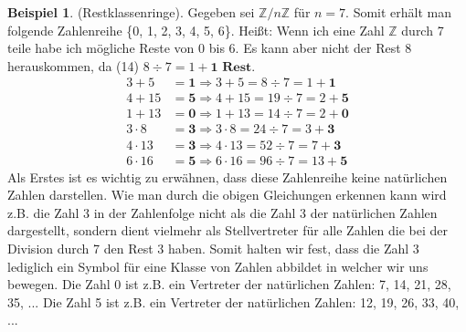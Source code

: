 \documentclass[12pt,a4paper]{article}
\theoremstyle{definition}
\newtheorem{bsp}{Beispiel}[subsection]
\begin{document}
\begin{bsp}(Restklassenringe).\newline
Gegeben sei $\mathbb{Z}/n \mathbb{Z}$ für $n = 7$.\newline
Somit erhält man folgende Zahlenreihe \{0, 1, 2, 3, 4, 5, 6\}.\newline
Heißt: Wenn ich eine Zahl $\mathbb{Z}$ durch 7 teile habe ich mögliche Reste von 0 bis 6.
Es kann aber nicht der Rest 8 herauskommen, da (14) $8 \div 7 = 1 + \textbf{1 Rest}$.
\begin{align}
3 + 5      &= \textbf{1} \Rightarrow 3 + 5 = 8  \div 7 = 1 + \textbf{1} \\
4 + 15     &= \textbf{5} \Rightarrow 4 + 15 = 19  \div 7 = 2 + \textbf{5} \\
1 + 13     &= \textbf{0} \Rightarrow 1 + 13 = 14  \div 7 = 2 + \textbf{0} \\
3 \cdot 8  &= \textbf{3} \Rightarrow 3 \cdot 8 = 24 \div 7 = 3 + \textbf{3}\\
4 \cdot 13 &= \textbf{3} \Rightarrow 4 \cdot 13 = 52 \div 7 = 7 + \textbf{3}\\
6 \cdot 16 &= \textbf{5} \Rightarrow 6 \cdot 16 = 96 \div 7 = 13 + \textbf{5}
\end{align}
Als Erstes ist es wichtig zu erwähnen, dass diese Zahlenreihe keine natürlichen Zahlen darstellen.
Wie man durch die obigen Gleichungen erkennen kann wird z.B. die Zahl 3 in der Zahlenfolge nicht als die Zahl 3 der natürlichen Zahlen dargestellt, sondern dient vielmehr als Stellvertreter für alle Zahlen die bei der Division durch 7 den Rest 3 haben.
Somit halten wir fest, dass die Zahl 3 lediglich ein Symbol für eine Klasse von Zahlen abbildet in welcher wir uns bewegen.\newline
Die Zahl 0 ist z.B. ein Vertreter der natürlichen Zahlen: 7, 14, 21, 28, 35, ...\newline
Die Zahl 5 ist z.B. ein Vertreter der natürlichen Zahlen: 12, 19, 26, 33, 40, ...
\end{bsp}
\end{document}
